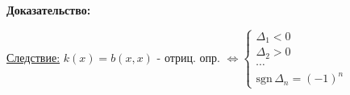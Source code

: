 \textbf{Доказательство:} %

\underline{Следствие:} $k(x)=b(x,x)$ - отриц. опр. $\Leftrightarrow \left\{ \begin{matrix} \Delta_1 < 0 \\ \Delta_2 > 0 \\ \cdots \\ \mathrm{sgn}\, \Delta_n = (-1)^n \end{matrix} \right.$
                                                                                                                                                      














